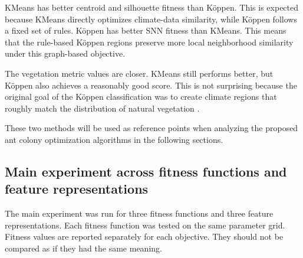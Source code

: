 \documentclass[11pt]{article}
\begin{document}

\begin{table}[ht]
\centering
\caption{Reference regionalizations.}
\label{tab:reference_results}
\end{table}

KMeans has better centroid and silhouette fitness than Köppen. This is expected because KMeans directly optimizes climate-data similarity, while Köppen follows a fixed set of rules. Köppen has better SNN fitness than KMeans. This means that the rule-based Köppen regions preserve more local neighborhood similarity under this graph-based objective.

The vegetation metric values are closer. KMeans still performs better, but Köppen also achieves a reasonably good score. This is not surprising because the original goal of the Köppen classification was to create climate regions that roughly match the distribution of natural vegetation \cite{koppen1936,peel2007}.

These two methods will be used as reference points when analyzing the proposed ant colony optimization algorithms in the following sections.


\subsection{Main experiment across fitness functions and feature representations}

The main experiment was run for three fitness functions and three feature representations. Each fitness function was tested on the same parameter grid. Fitness values are reported separately for each objective. They should not be compared as if they had the same meaning.
\end{document}
